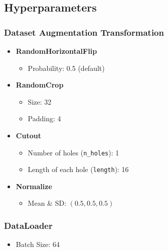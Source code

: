 \documentclass[12pt]{article}
\begin{document}
\newpage
\subsection{Hyperparameters}
\fontsize{10}{12}\selectfont


\begin{multicols}{2}
\subsubsection*{Dataset Augmentation Transformation}

\begin{itemize}
  \item \textbf{RandomHorizontalFlip}
    \begin{itemize}
      \item Probability: 0.5 (default)
    \end{itemize}
  \item \textbf{RandomCrop}
    \begin{itemize}
      \item Size: 32
      \item Padding: 4
    \end{itemize}
  \item \textbf{Cutout}
    \begin{itemize}
      \item Number of holes (\texttt{n\_holes}): 1
      \item Length of each hole (\texttt{length}): 16
    \end{itemize}
  \item \textbf{Normalize}
    \begin{itemize}
      \item Mean \& SD: $(0.5, 0.5, 0.5)$
    \end{itemize}
\end{itemize}

\subsubsection*{DataLoader}

\begin{itemize}
  \item Batch Size: 64
\end{itemize}


\end{multicols}
\end{document}
